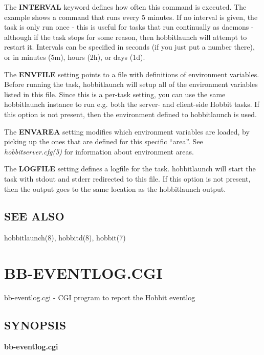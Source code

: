   The \textbf{INTERVAL}
 keyword defines how often this command is executed. The example shows
 a command that runs every 5 minutes. If no interval is given, the
 task is only run once - this is useful for tasks that run continually
 as daemons - although if the task stops for some reason, then
 hobbitlaunch will attempt to restart it. Intervals can be specified
 in seconds (if you just put a number there), or in minutes (5m),
 hours (2h), or days (1d). 



  The \textbf{ENVFILE}
 setting points to a file with definitions of environment
 variables. Before running the task, hobbitlaunch will setup all of
 the environment variables listed in this file. Since this is a
 per-task setting, you can use the same hobbitlaunch instance to run
 e.g. both the server- and client-side Hobbit tasks. If this option is
 not present, then the environment defined to hobbitlaunch is used. 



  The \textbf{ENVAREA}
 setting modifies which environment variables are loaded, by picking
 up the ones that are defined for this specific ``area''. See
 \emph{hobbitserver.cfg(5)} for information about environment areas. 


  The \textbf{LOGFILE}
 setting defines a logfile for the task. hobbitlaunch will start the
 task with stdout and stderr redirected to this file. If this option
 is not present, then the output goes to the same location as the
 hobbitlaunch output. 



 
\subsection{SEE ALSO}
hobbitlaunch(8), hobbitd(8), hobbit(7) 

%
\newpage
\section{BB-EVENTLOG.CGI}

 bb-eventlog.cgi - CGI program to report the Hobbit eventlog \subsection{SYNOPSIS}
\textbf{bb-eventlog.cgi}


